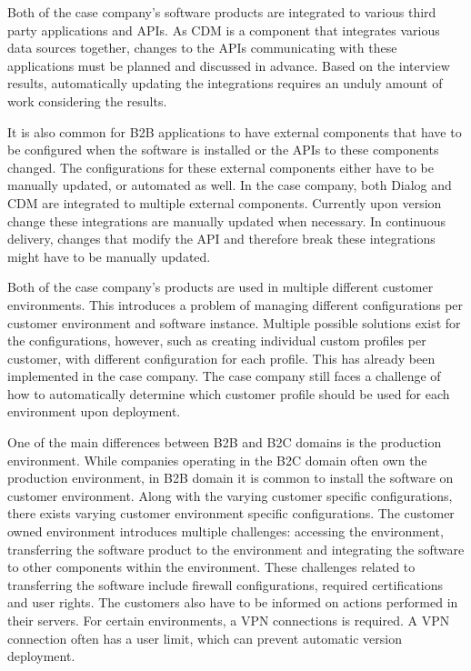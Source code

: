 \documentclass[english]{tktltiki2}
\theoremstyle{definition}
\theoremstyle{remark}
\begin{document}


Both of the case company's software products are integrated to various third party applications and APIs. As CDM is a component that integrates various data sources together, changes to the APIs communicating with these applications must be planned and discussed in advance. Based on the interview results, automatically updating the integrations requires an unduly amount of work considering the results. 

It is also common for B2B applications to have external components that have to be configured when the software is installed or the APIs to these components changed. The configurations for these external components either have to be manually updated, or automated as well. In the case company, both Dialog and CDM are integrated to multiple external components. Currently upon version change these integrations are manually updated when necessary. In continuous delivery, changes that modify the API and therefore break these integrations might have to be manually updated.

Both of the case company's products are used in multiple different customer environments. This introduces a problem of managing different configurations per customer environment and software instance. Multiple possible solutions exist for the configurations, however, such as creating individual custom profiles per customer, with different configuration for each profile. This has already been implemented in the case company. The case company still faces a challenge of how to automatically determine which customer profile should be used for each environment upon deployment.

One of the main differences between B2B and B2C domains is the production environment. While companies operating in the B2C domain often own the production environment, in B2B domain it is common to install the software on customer environment. Along with the varying customer specific configurations, there exists varying customer environment specific configurations. The customer owned environment introduces multiple challenges: accessing the environment, transferring the software product to the environment and integrating the software to other components within the environment. These challenges related to transferring the software include firewall configurations, required certifications and user rights. The customers also have to be informed on actions performed in their servers. For certain environments, a VPN connections is required. A VPN connection often has a user limit, which can prevent automatic version deployment.
\end{document}
